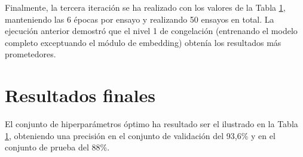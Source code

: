 Finalmente, la tercera iteración se ha realizado con los valores de la Tabla \ref{}, manteniendo las 6 épocas por ensayo y realizando 50 ensayos en total. La ejecución anterior demostró que el nivel 1 de congelación (entrenando el modelo completo exceptuando el módulo de embedding) obtenía los resultados más prometedores.

\section{Resultados finales}
El conjunto de hiperparámetros óptimo ha resultado ser el ilustrado en la Tabla \ref{}, obteniendo una precisión en el conjunto de validación del 93,6\% y en el conjunto de prueba del 88\%.  



  
